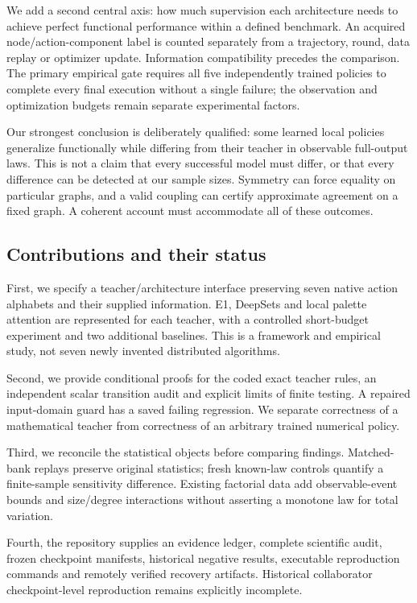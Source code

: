 \documentclass[
  11pt,
]{article}
\begin{document}
We add a second central axis: how much supervision each architecture
needs to achieve perfect functional performance within a defined
benchmark. An acquired node/action-component label is counted separately
from a trajectory, round, data replay or optimizer update. Information
compatibility precedes the comparison. The primary empirical gate
requires all five independently trained policies to complete every final
execution without a single failure; the observation and optimization
budgets remain separate experimental factors.

Our strongest conclusion is deliberately qualified: some learned local
policies generalize functionally while differing from their teacher in
observable full-output laws. This is not a claim that every successful
model must differ, or that every difference can be detected at our
sample sizes. Symmetry can force equality on particular graphs, and a
valid coupling can certify approximate agreement on a fixed graph. A
coherent account must accommodate all of these outcomes.

\subsection{Contributions and their
status}\label{contributions-and-their-status}

First, we specify a teacher/architecture interface preserving seven
native action alphabets and their supplied information. E1, DeepSets and
local palette attention are represented for each teacher, with a
controlled short-budget experiment and two additional baselines. This is
a framework and empirical study, not seven newly invented distributed
algorithms.

Second, we provide conditional proofs for the coded exact teacher rules,
an independent scalar transition audit and explicit limits of finite
testing. A repaired input-domain guard has a saved failing regression.
We separate correctness of a mathematical teacher from correctness of an
arbitrary trained numerical policy.

Third, we reconcile the statistical objects before comparing findings.
Matched-bank replays preserve original statistics; fresh known-law
controls quantify a finite-sample sensitivity difference. Existing
factorial data add observable-event bounds and size/degree interactions
without asserting a monotone law for total variation.

Fourth, the repository supplies an evidence ledger, complete scientific
audit, frozen checkpoint manifests, historical negative results,
executable reproduction commands and remotely verified recovery
artifacts. Historical collaborator checkpoint-level reproduction remains
explicitly incomplete.
\end{document}

